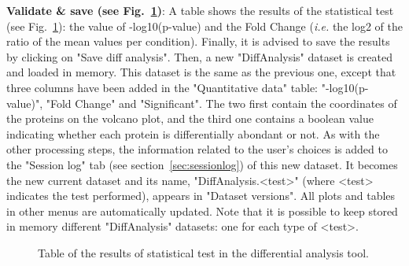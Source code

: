 \documentclass[12pt]{article}
\begin{document}
\textbf{Validate \& save (see Fig.~\ref{fig:anadiff4})}: 
A table shows the results of the statistical test (see Fig.~\ref{fig:anadiff4}): the value of -log10(p-value) and the Fold Change (\emph{i.e.} the log2 of the ratio of the mean values per condition). Finally, it is advised to save the results by clicking on "Save diff analysis". Then, a new "DiffAnalysis" dataset is created and loaded in memory. This dataset is the same as the previous one, except that three columns have been added in the "Quantitative data" table: "-log10(p-value)",  "Fold Change" and "Significant". The two first contain the coordinates of the proteins on the volcano plot, and the third one contains a boolean value indicating whether each protein is differentially abondant or not. As with the other processing steps, the information related to the user's choices is added to the "Session log" tab (see section~\ref{sec:sessionlog}) of this new dataset.
It becomes the new current dataset and its name, "DiffAnalysis.<test>" (where <test> indicates the test performed), appears in "Dataset versions". All plots and tables in other menus are automatically updated. Note that it is possible to keep stored in memory different "DiffAnalysis" datasets: one for each type of <test>.


\begin{figure}
\centering
{}
\caption{Table of the results of statistical test in the differential analysis tool.}\label{fig:anadiff4}
\end{figure}
\end{document}
